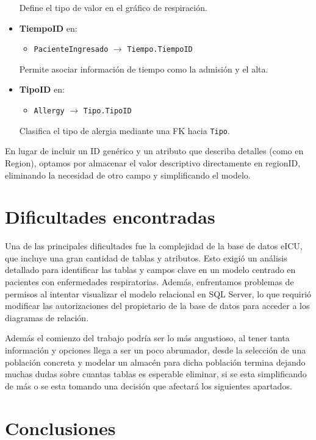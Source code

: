 \documentclass[12pt, a4paper, twoside]{article}
\begin{document}
\begin{itemize}
		Define el tipo de valor en el gráfico de respiración.
		
		\item \textbf{TiempoID} en:
		\begin{itemize}
			\item \texttt{PacienteIngresado} $\rightarrow$ \texttt{Tiempo.TiempoID}
		\end{itemize}
		
		Permite asociar información de tiempo como la admisión y el alta.
		
		\item \textbf{TipoID} en:
		\begin{itemize}
			\item \texttt{Allergy} $\rightarrow$ \texttt{Tipo.TipoID}
		\end{itemize}
		
		Clasifica el tipo de alergia mediante una FK hacia \texttt{Tipo}.
		
	\end{itemize}
	
	
	En lugar de incluir un ID genérico y un atributo que describa detalles (como en Region), optamos por almacenar el valor descriptivo directamente en regionID, eliminando la necesidad de otro campo y simplificando el modelo.
	
	\section{Dificultades encontradas}
	
	
	Una de las principales dificultades fue la complejidad de la base de datos eICU, que incluye una gran cantidad de tablas y atributos. Esto exigió un análisis detallado para identificar las tablas y campos clave en un modelo centrado en pacientes con enfermedades respiratorias. Además, enfrentamos problemas de permisos al intentar visualizar el modelo relacional en SQL Server, lo que requirió modificar las autorizaciones del propietario de la base de datos para acceder a los diagramas de relación.
	
	Además el comienzo del trabajo podría ser lo más angustioso, al tener tanta información y opciones llega a ser un poco abrumador, desde la selección de una población concreta y modelar un almacén para dicha población termina dejando muchas dudas sobre cuantas tablas es esperable eliminar, si se esta simplificando de más o se esta tomando una decisión que afectará los siguientes apartados. 
	
	\section{Conclusiones}
	
\end{document}
